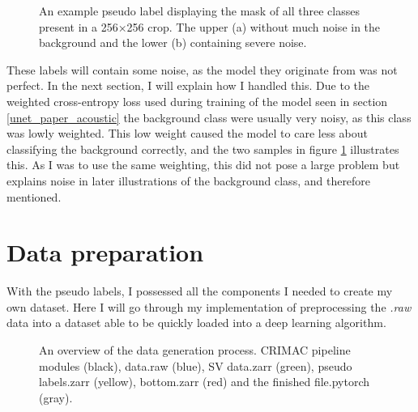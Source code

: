         \clearpage
        \begin{figure}[H]
        \centering
        
        
        
        
        \caption[Noise in background comparison]{An example pseudo label displaying the mask of all three classes present in a 256×256 crop. The upper (a) without much noise in the background and the lower (b) containing severe noise.}
        \label{data sample fig}
        
        \end{figure}
        These labels will contain some noise, as the model they originate from was not perfect. In the next section, I will explain how I handled this. Due to the weighted cross-entropy loss used during training of the model seen in section \ref{unet_paper_acoustic} the background class were usually very noisy, as this class was lowly weighted. This low weight caused the model to care less about classifying the background correctly, and the two samples in figure \ref{data sample fig} illustrates this. As I was to use the same weighting, this did not pose a large problem but explains noise in later illustrations of the background class, and therefore mentioned.

        
    \section{Data preparation}
        With the pseudo labels, I possessed all the components I needed to create my own dataset. Here I will go through my implementation of preprocessing the \textit{.raw} data into a dataset able to be quickly loaded into a deep learning algorithm.
        
        \clearpage
        \begin{figure}[H]
            \centering
            
            \caption[Data generation process]{An overview of the data generation process. CRIMAC pipeline modules (black), data.raw (blue), SV data.zarr (green), pseudo labels.zarr (yellow), bottom.zarr (red) and the finished file.pytorch (gray).}
          	\medskip 
            \label{data_generation_flowchart_fig}
        \end{figure}
        
